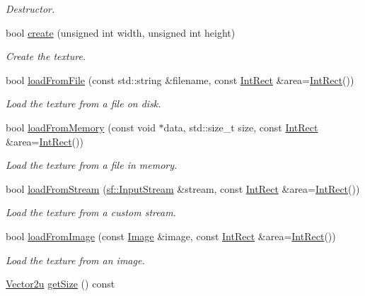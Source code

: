 \begin{DoxyCompactItemize}
\begin{DoxyCompactList}\small\item\em Destructor. \end{DoxyCompactList}\item 
bool \hyperlink{classsf_1_1Texture_a89b4c7d204acf1033c3a1b6e0a3ad0a3}{create} (unsigned int width, unsigned int height)
\begin{DoxyCompactList}\small\item\em Create the texture. \end{DoxyCompactList}\item 
bool \hyperlink{classsf_1_1Texture_a8e1b56eabfe33e2e0e1cb03712c7fcc7}{load\-From\-File} (const std\-::string \&filename, const \hyperlink{classsf_1_1Rect}{Int\-Rect} \&area=\hyperlink{classsf_1_1Rect}{Int\-Rect}())
\begin{DoxyCompactList}\small\item\em Load the texture from a file on disk. \end{DoxyCompactList}\item 
bool \hyperlink{classsf_1_1Texture_a2c4adb19dd4cbee0a588eeb85e52a249}{load\-From\-Memory} (const void $\ast$data, std\-::size\-\_\-t size, const \hyperlink{classsf_1_1Rect}{Int\-Rect} \&area=\hyperlink{classsf_1_1Rect}{Int\-Rect}())
\begin{DoxyCompactList}\small\item\em Load the texture from a file in memory. \end{DoxyCompactList}\item 
bool \hyperlink{classsf_1_1Texture_a6803a13465a7113a8964d1081841886d}{load\-From\-Stream} (\hyperlink{classsf_1_1InputStream}{sf\-::\-Input\-Stream} \&stream, const \hyperlink{classsf_1_1Rect}{Int\-Rect} \&area=\hyperlink{classsf_1_1Rect}{Int\-Rect}())
\begin{DoxyCompactList}\small\item\em Load the texture from a custom stream. \end{DoxyCompactList}\item 
bool \hyperlink{classsf_1_1Texture_abec4567ad9856a3596dc74803f26fba2}{load\-From\-Image} (const \hyperlink{classsf_1_1Image}{Image} \&image, const \hyperlink{classsf_1_1Rect}{Int\-Rect} \&area=\hyperlink{classsf_1_1Rect}{Int\-Rect}())
\begin{DoxyCompactList}\small\item\em Load the texture from an image. \end{DoxyCompactList}\item 
\hyperlink{classsf_1_1Vector2}{Vector2u} \hyperlink{classsf_1_1Texture_a0f370acd8f41c8b97a6959389c521c2c}{get\-Size} () const 

\end{DoxyCompactItemize}
